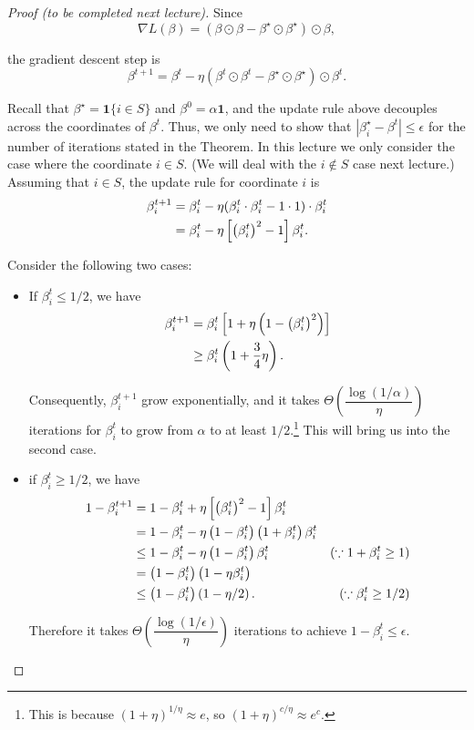 \begin{proof}[Proof (to be completed next lecture)]

Since
\begin{equation}
\nabla L(\beta) = (\beta\odot \beta-\beta^\star\odot\beta^\star)\odot\beta,
\end{equation}

the gradient descent step is
\begin{equation}
\beta^{t+1} = \beta^t - \eta (\beta^t \odot \beta^t -\beta^\star \odot \beta^\star)\odot\beta^t.
\end{equation}

Recall that $\beta^\star=\mathbf{1} \{i \in S \}$ and $\beta^0=\alpha \mathbf{1}$, and the update rule above decouples across the coordinates of $\beta^t$. Thus, we only need to show that $| \beta_i^\star - \beta^t | \leq \epsilon$ for the number of iterations stated in the Theorem. In this lecture we only consider the case where the coordinate $i\in S$. (We will deal with the $i\not\in S$ case next lecture.) Assuming that $i \in S$, the update rule for coordinate $i$ is
\begin{align}
\beta_i^{t+1} &= \beta_i^t - \eta (\beta_i^t \cdot \beta_i^t - 1 \cdot 1) \cdot\beta_i^t \\ 
&= \beta_i^t - \eta \left[ \left(\beta_i^t\right)^2 - 1 \right] \beta_i^t.
\end{align}

Consider the following two cases:

\begin{itemize}
\item If $\beta_i^t\le 1/2$, we have
\begin{align}
\beta_i^{t+1}&=\beta_i^{t} \left[ 1+\eta \left(1- \left(\beta_i^t \right)^2 \right) \right] \\
&\ge \beta_i^t \left( 1+\frac{3}{4}\eta \right).
\end{align}

Consequently, $\beta_i^{t+1}$ grow exponentially, and it takes $\Theta\left(\dfrac{\log (1/\alpha)}{\eta}\right)$ iterations for $\beta_i^t$ to grow from $\alpha$ to at least $1/2.$\footnote{This is because $(1+\eta)^{1/\eta}\approx e$, so $(1+\eta)^{c/\eta}\approx e^{c}.$} This will bring us into the second case.
    
\item if $\beta_i^t\ge 1/2$, we have
\begin{align}
1-\beta_i^{t+1}&=1-\beta_i^t+\eta \left[ \left(\beta_i^t \right)^2-1 \right] \beta_i^t\\
&=1-\beta_i^{t}-\eta \left( 1-\beta_i^t \right) \left(1+\beta_i^t \right)\beta_i^t\\
&\le 1-\beta_i^t-\eta \left( 1-\beta_i^t \right)\beta_i^t &(\because 1+\beta_i^t\ge 1) \\
&= \left(1-\beta_i^t \right) \left( 1-\eta \beta_i^t \right) \\
&\le \left( 1-\beta_i^t \right) \left(1-\eta/2 \right). &(\because \beta_i^t\ge 1/2)
\end{align}

Therefore it takes $\Theta\left(\dfrac{\log (1/\epsilon)}{\eta}\right)$ iterations to achieve $1-\beta_i^t\le \epsilon.$
\end{itemize}

\end{proof}